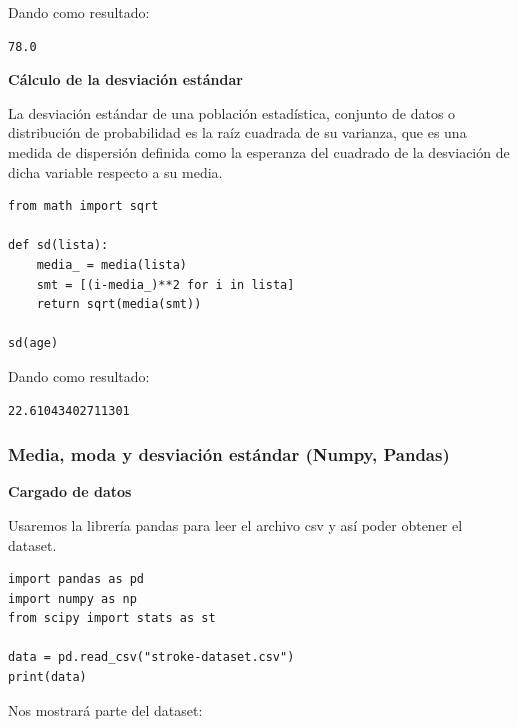 \documentclass[letter]{article}
\begin{document}
Dando como resultado:

\begin{verbatim}
78.0
\end{verbatim}

\textbf{Cálculo de la desviación estándar}

La desviación estándar de una población estadística, conjunto de datos o
distribución de probabilidad es la raíz cuadrada de su varianza, que es una
medida de dispersión definida como la esperanza del cuadrado de la desviación de
dicha variable respecto a su media.

\begin{verbatim}
from math import sqrt

def sd(lista):
    media_ = media(lista)
    smt = [(i-media_)**2 for i in lista]
    return sqrt(media(smt))

sd(age)
\end{verbatim}

Dando como resultado:

\begin{verbatim}
22.61043402711301
\end{verbatim}

\subsubsection{Media, moda y desviación estándar (Numpy, Pandas)}
\label{sec:org0446350}

\textbf{Cargado de datos}

Usaremos la librería pandas para leer el archivo csv y así poder obtener el dataset.

\begin{verbatim}
import pandas as pd
import numpy as np
from scipy import stats as st

data = pd.read_csv("stroke-dataset.csv")
print(data)
\end{verbatim}

Nos mostrará parte del dataset:
\end{document}

